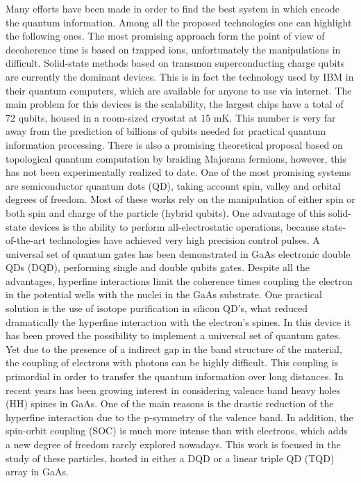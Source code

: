 Many efforts have been made in order to find the best system in which encode the quantum information. Among all the proposed technologies one can highlight the following ones. The most promising approach form the point of view of decoherence time is based on trapped ions\cite{Debnath2016}, unfortunately the manipulations in difficult. Solid-state methods based on transmon superconducting charge qubits are currently the dominant devices. This is in fact the technology used by IBM in their quantum computers, which are available for anyone to use via internet\cite{McKay2018}. The main problem for this devices is the scalability, the largest chips have a total of 72 qubits, housed in a room-sized cryostat at 15 mK. This number is very far away from the prediction of billions of qubits needed for practical quantum information processing\cite{Fowler2012}. There is also a promising theoretical proposal based on topological quantum computation by braiding Majorana fermions\cite{Nickerson2013}, however, this has not been experimentally realized to date. One of the most promising systems are semiconductor quantum dots (QD), taking account spin, valley and orbital degrees of freedom. Most of these works rely on the manipulation of either spin or both spin and charge of the particle (hybrid qubits). One advantage of this solid-state devices is the ability to perform all-electrostatic operations, because state-of-the-art technologies have achieved very high precision control pulses. A universal set of quantum gates has been demonstrated in GaAs electronic double QDs (DQD), performing single and double qubits gates\cite{Petta2010,Ribeiro2009}. Despite all the advantages, hyperfine interactions limit the coherence times coupling the electron in the potential wells with the nuclei in the GaAs substrate. One practical solution is the use of isotope purification in silicon QD's, what reduced dramatically the hyperfine interaction with the electron's spines. In this device it has been proved the possibility to implement a universal set of quantum gates\cite{Masuda2018}. Yet due to the presence of a indirect gap in the band structure of the material, the coupling of electrons with photons can be highly difficult. This coupling is primordial in order to transfer the quantum information over long distances. In recent years has been growing interest in considering valence band heavy holes (HH) spines in GaAs. One of the main reasons is the drastic reduction of the hyperfine interaction due to the p-symmetry of the valence band. In addition, the spin-orbit coupling (SOC) is much more intense than with electrons, which adds a new degree of freedom rarely explored nowadays. This work is focused in the study of these particles, hosted in either a DQD or a linear triple QD (TQD) array in GaAs.\\

